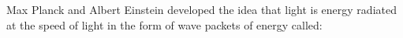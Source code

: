 Max Planck and Albert Einstein developed the idea that light is energy 
radiated at the speed of light in the form of wave packets of energy called: